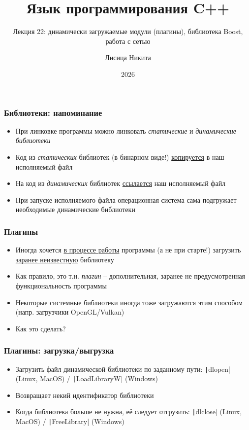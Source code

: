 \documentclass[10pt]{beamer}
\title{Язык программирования C++}
\subtitle{Лекция 22: динамически загружаемые модули (плагины), библиотека Boost, работа с сетью}
\author{Лисица Никита}
\date{2026}
\begin{document}
\frame{\titlepage}

\begin{frame}[fragile]
\frametitle{Библиотеки: напоминание}
\begin{itemize}
\item При линковке программы можно линковать \textit{статические} и \textit{динамические библиотеки}
\pause
\item Код из \textit{статических} библиотек (в бинарном виде!) \underline{копируется} в наш исполняемый файл
\pause
\item На код из \textit{динамических} библиотек \underline{ссылается} наш исполняемый файл
\pause
\item При запуске исполняемого файла операционная система сама подгружает необходимые динамические библиотеки
\end{itemize}
\end{frame}

\begin{frame}[fragile]
\frametitle{Плагины}
\begin{itemize}
\item Иногда хочется \underline{в процессе работы} программы (а не при старте!) загрузить \underline{заранее неизвестную} библиотеку
\pause
\item Как правило, это т.н. \textit{плагин} -- дополнительная, заранее не предусмотренная функциональность программы
\pause
\item Некоторые системные библиотеки иногда тоже загружаются этим способом (напр. загрузчики OpenGL/Vulkan)
\pause
\item Как это сделать?
\end{itemize}
\end{frame}

\begin{frame}[fragile]
\frametitle{Плагины: загрузка/выгрузка}
\begin{itemize}
\item Загрузить файл динамической библиотеки по заданному пути: \texttt|dlopen| (Linux, MacOS) / \texttt|LoadLibraryW| (Windows)
\pause
\item Возвращает некий идентификатор библиотеки
\pause
\item Когда библиотека больше не нужна, её следует отгрузить: \texttt|dlclose| (Linux, MacOS) / \texttt|FreeLibrary| (Windows)
\end{itemize}
\end{frame}
\end{document}
